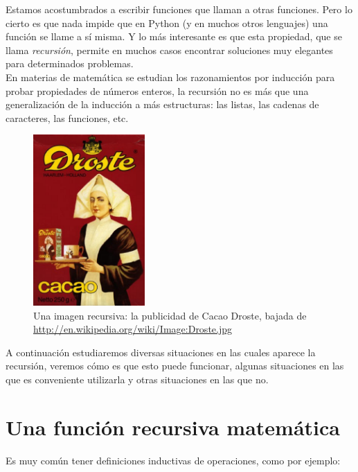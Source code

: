 Estamos acostumbrados a escribir funciones que llaman a otras funciones.
Pero lo cierto es que nada impide que en Python (y en muchos otros
lenguajes) una función se llame a sí misma. Y lo más interesante es que
esta propiedad, que se llama {\it recursión}, permite en muchos casos
encontrar soluciones muy elegantes para determinados problemas. \\

En materias de matemática se estudian los razonamientos por inducción para
probar propiedades de números enteros, la recursión no es más que una
generalización de la inducción a más estructuras: las listas, las cadenas
de caracteres, las funciones, etc. 

\begin{figure}
  \begin{center}
    \includegraphics[width=0.38\textwidth]{graficos/droste}
  \end{center}
  \caption{\small Una imagen recursiva: la publicidad de Cacao Droste,
bajada de \url{http://en.wikipedia.org/wiki/Image:Droste.jpg}}
\end{figure}

A continuación estudiaremos diversas situaciones en las cuales aparece la
recursión, veremos cómo es que esto puede funcionar, algunas situaciones en
las que es conveniente utilizarla y otras situaciones en las que no. 


\section{Una función recursiva matemática}

Es muy común tener definiciones inductivas de operaciones, como por ejemplo:

